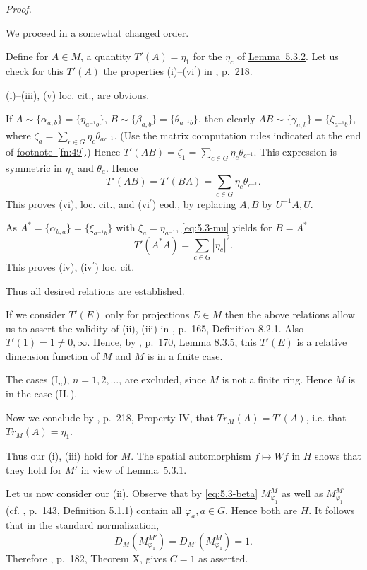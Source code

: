 \documentclass[b5paper,twoside]{article}
\newcommand{\lemref}[2]{\hyperref[#1]{\mbox{Lemma~#2}}}
\theoremstyle{mvnplain}
\renewenvironment{proof}[1][Proof]{%
  \par\addvspace{0.35\baselineskip}%
  \noindent\textit{#1.}\ \normalfont\ignorespaces
}{%
  \par\addvspace{0.35\baselineskip}%
}
\newcommand{\M}{\mathbf M}
\newcommand{\Hilbert}{\mathfrak H}
\def\M{M}%
\def\Hilbert{H}%
\def\operatorname#1{#1}%
\def\mathfrak#1{#1}%
\begin{document}
\begin{proof}
We proceed in a somewhat changed order.

Define for \(A\in\M\), a quantity \(T'(A)=\eta_1\) for the \(\eta_c\) of
\lemref{lem:5.3.2}{5.3.2}. Let us check for this \(T'(A)\) the properties
(i)--(vi\(^{\prime}\)) in \cite{ref6}, p.~218.

(i)--(iii), (v) loc. cit., are obvious.

If \(A\sim\{\alpha_{a,b}\}=\{\eta_{a^{-1}b}\}\),
\(B\sim\{\beta_{a,b}\}=\{\theta_{a^{-1}b}\}\), then clearly
\(AB\sim\{\gamma_{a,b}\}=\{\zeta_{a^{-1}b}\}\), where
\(\zeta_a=\sum_{c\in\mathfrak G}\eta_c\theta_{ac^{-1}}\). (Use the matrix
computation rules indicated at the end of
\hyperref[fn:49]{footnote~\ref*{fn:49}}.) Hence
\(T'(AB)=\zeta_1=\sum_{c\in\mathfrak G}\eta_c\theta_{c^{-1}}\). This
expression is symmetric in \(\eta_a\) and \(\theta_a\). Hence
\begin{equation}\tag{5.3.\(\mu\)}\label{eq:5.3-mu}
 T'(AB)=T'(BA)=\sum_{c\in\mathfrak G}\eta_c\theta_{c^{-1}}.
\end{equation}
This proves (vi), loc. cit., and (vi\(^{\prime}\)) eod., by replacing \(A,B\) by
\(U^{-1}A,U\).

As \(A^*=\{\overline{\alpha}_{b,a}\}=\{\xi_{a^{-1}b}\}\) with
\(\xi_a=\overline{\eta}_{a^{-1}}\), \eqref{eq:5.3-mu} yields for \(B=A^*\)
\begin{equation}\tag{5.3.\(\nu\)}\label{eq:5.3-nu}
 T'(A^*A)=\sum_{c\in\mathfrak G}|\eta_c|^2.
\end{equation}
This proves (iv), (iv\(^{\prime}\)) loc. cit.

Thus all desired relations are established.

If we consider \(T'(E)\) only for projections \(E\in\M\) then the above
relations allow us to assert the validity of (ii), (iii) in
\cite{ref5}, p.~165, Definition 8.2.1. Also
\(T'(1)=1\ne0,\infty\). Hence, by \cite{ref5}, p.~170, Lemma
8.3.5, this \(T'(E)\) is a relative dimension function of \(\M\) and \(\M\)
is in a finite case.

The cases (I\(_n\)), \(n=1,2,\ldots\), are excluded, since \(\M\) is not a
finite ring. Hence \(\M\) is in the case (II\(_1\)).

Now we conclude by \cite{ref6}, p.~218, Property IV, that
\(\operatorname{Tr}_{\M}(A)=T'(A)\), i.e. that
\(\operatorname{Tr}_{\M}(A)=\eta_1\).

Thus our (i), (iii) hold for \(\M\). The spatial automorphism
\(f\mapsto Wf\) in \(\Hilbert\) shows that they hold for \(\M'\) in view of
\lemref{lem:5.3.1}{5.3.1}.

Let us now consider our (ii). Observe that by \eqref{eq:5.3-beta}
\(\mathfrak M^{\M}_{\varphi_1}\) as well as
\(\mathfrak M^{\M'}_{\varphi_1}\) (cf. \cite{ref5}, p.~143,
Definition 5.1.1) contain all \(\varphi_a,a\in\mathfrak G\). Hence both are
\(\Hilbert\). It follows that in the standard normalization,
\[
 D_{\M}(\mathfrak M^{\M'}_{\varphi_1})
 =D_{\M'}(\mathfrak M^{\M}_{\varphi_1})=1.
\]
Therefore \cite{ref5}, p.~182, Theorem X, gives \(C=1\) as
asserted.
\end{proof}
\end{document}

